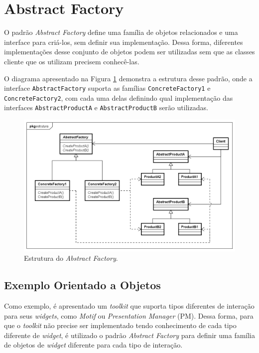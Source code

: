 \section{Abstract Factory}

O padrão \textit{Abstract Factory} define uma família 
de objetos relacionados e uma interface para 
criá-los, sem definir sua implementação. Dessa 
forma, diferentes implementações desse 
conjunto de objetos podem ser utilizadas 
sem que as classes cliente que os utilizam 
precisem conhecê-las.\cite{gamma:1995}

O diagrama apresentado na Figura \ref{abfactory_struct} 
demonstra a estrutura desse padrão, onde a 
interface \texttt{AbstractFactory} suporta as famílias 
\texttt{ConcreteFactory1} e \texttt{ConcreteFactory2}, com cada uma 
delas definindo qual implementação das interfaces 
\texttt{AbstractProductA} e \texttt{AbstractProductB} serão 
utilizadas.

\begin{figure}[htb]
	\caption{\label{abfactory_struct}Estrutura do \textit{Abstract Factory}.}
	\begin{center}
	    \includegraphics[scale=0.5]{5_padroes-contexto-funcional/5.1_criacionais/5.1.2_abstract-factory/abstractfactory_estrutura.png}
	\end{center}
\end{figure}

\subsection*{Exemplo Orientado a Objetos}

Como exemplo, é apresentado um \textit{toolkit} 
que suporta tipos diferentes de interação para 
seus \textit{widgets}, como \textit{Motif} ou \textit{Presentation 
Manager} (PM). Dessa forma, para que o \textit{toolkit} 
não precise ser implementado tendo conhecimento 
de cada tipo diferente de \textit{widget}, é 
utilizado o padrão \textit{Abstract Factory} para 
definir uma família de objetos de \textit{widget} 
diferente para cada tipo de interação. 

